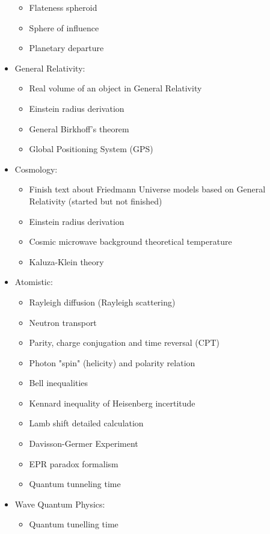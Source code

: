 \begin{itemize}
\begin{itemize}
				\item Flateness spheroid
				\item Sphere of influence
				\item Planetary departure
			\end{itemize}		
		\item General Relativity:
			\begin{itemize}
				\item Real volume of an object in General Relativity
				\item Einstein radius derivation
				\item General Birkhoff's theorem
				\item Global Positioning System (GPS)		
			\end{itemize}
		\item Cosmology:
			\begin{itemize}
				\item Finish text about Friedmann Universe models based on General Relativity (started but not finished)
				\item Einstein radius derivation
				\item Cosmic microwave background theoretical temperature			
				\item Kaluza-Klein theory
			\end{itemize}
		\item Atomistic:
			\begin{itemize}
				\item Rayleigh diffusion (Rayleigh scattering)
				\item Neutron transport
				\item Parity, charge conjugation and time reversal (CPT)
				\item Photon "spin" (helicity) and polarity relation
				\item Bell inequalities
				\item Kennard inequality of Heisenberg incertitude
				\item Lamb shift detailed calculation
				\item Davisson-Germer Experiment
				\item EPR paradox formalism
				\item Quantum tunneling time
			\end{itemize}
		\item Wave Quantum Physics:
			\begin{itemize}
				\item Quantum tunelling time
			\end{itemize}

\end{itemize}
